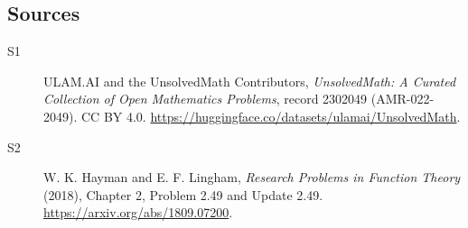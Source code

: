 \documentclass[11pt]{article}
\begin{document}
\subsection{Sources}
\begin{description}
\item[\hypertarget{source:2302049:1}{S1}] ULAM.AI and the UnsolvedMath Contributors, \emph{UnsolvedMath: A Curated Collection of Open Mathematics Problems}, record 2302049 (AMR-022-2049). CC BY 4.0. \url{https://huggingface.co/datasets/ulamai/UnsolvedMath}.
\item[\hypertarget{source:2302049:2}{S2}] W. K. Hayman and E. F. Lingham, \emph{Research Problems in Function Theory} (2018), Chapter 2, Problem 2.49 and Update 2.49. \url{https://arxiv.org/abs/1809.07200}.
\end{description}
\label{end:2302049}
\end{document}
